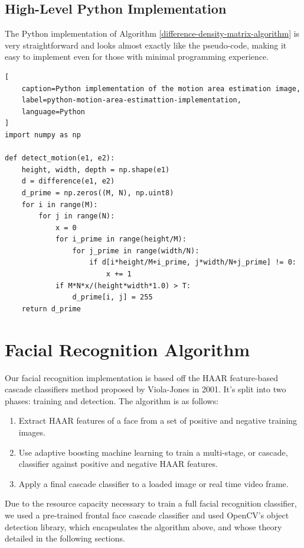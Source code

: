 \documentclass[journal]{IEEEtran}
\begin{document}
\subsection{High-Level Python Implementation}
The Python implementation of Algorithm \ref{difference-density-matrix-algorithm} is very straightforward and looks almost exactly like the pseudo-code, making it easy to implement even for those with minimal programming experience.
\begin{lstlisting}[
	caption=Python implementation of the motion area estimation image,
	label=python-motion-area-estimattion-implementation,
	language=Python
]
import numpy as np

def detect_motion(e1, e2):
    height, width, depth = np.shape(e1)
    d = difference(e1, e2)
    d_prime = np.zeros((M, N), np.uint8)
    for i in range(M):
        for j in range(N):
            x = 0
            for i_prime in range(height/M):
                for j_prime in range(width/N):
                    if d[i*height/M+i_prime, j*width/N+j_prime] != 0:
                        x += 1
            if M*N*x/(height*width*1.0) > T:
                d_prime[i, j] = 255
    return d_prime
\end{lstlisting}


\section{Facial Recognition Algorithm}
\label{facial-recognition-section}
Our facial recognition implementation is based off the HAAR feature-based cascade classifiers method proposed by Viola-Jones in 2001. It's split into two phases: training and detection. The algorithm is as follows:
\begin{enumerate}
	\item Extract HAAR features of a face from a set of positive and negative training images. 
	\item Use adaptive boosting machine learning to train a multi-stage, or cascade, classifier against positive and negative HAAR features. 
	\item Apply a final cascade classifier to a loaded image or real time video frame. 
\end{enumerate}
Due to the resource capacity necessary to train a full facial recognition classifier, we used a pre-trained frontal face cascade classifier and used OpenCV's object detection library, which encapsulates the algorithm above, and whose theory detailed in the following sections.
\end{document}
